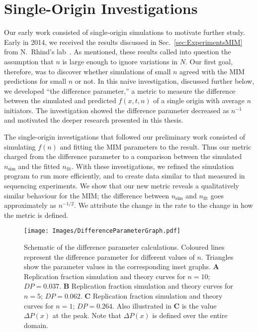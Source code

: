 	\section{Single-Origin Investigations}
	\label{sec:SingleOrigin}
	
	Our early work consisted of single-origin simulations to motivate further study.
	Early in 2014, we received the results discussed in Sec.~\ref{sec:ExperimentsMIM} from N.~Rhind's lab~\cite{Rhind}.
	As mentioned, these results called into question the assumption that $n$ is large enough to ignore variations in $N$.
	Our first goal, therefore, was to discover whether simulations of small $n$ agreed with the MIM predictions for small $n$ or not.
	In this naive investigation, discussed further below, we developed ``the difference parameter,'' a metric to measure the difference between the simulated and predicted $f(x,t,n)$ of a single origin with average $n$ initiators.
	The investigation showed the difference parameter decreased as $n^{-1}$ and motivated the deeper research presented in this thesis.
	
	The single-origin investigations that followed our preliminary work consisted of simulating $f(n)$ and fitting the MIM parameters to the result.
	Thus our metric charged from the difference parameter to a comparison between the simulated $n_\text{sim}$ and the fitted $n_\text{fit}$.
	With these investigations, we refined the simulation program to run more efficiently, and to create data similar to that measured in sequencing experiments.
	We show that our new metric reveals a qualitatively similar behaviour for the MIM; the difference between $n_\text{sim}$ and  $n_\text{fit}$ goes approximately as $n^{-1/2}$.
	We attribute the change in the rate to the change in how the metric is defined.
		
	\begin{figure}[tbh!]
		\begin{center}
			\texttt{[image: Images/DifferenceParameterGraph.pdf]}
		\end{center}
			\caption[Difference Parameter]{\label{fig:DifferenceParameter} Schematic of the difference parameter calculations.
				Coloured lines represent the difference parameter for different values of $n$.
				Triangles show the parameter values in the corresponding inset graphs.
				\textbf{A} Replication fraction simulation and theory curves for $n=10$; $DP=0.037$.
				\textbf{B} Replication fraction simulation and theory curves for $n=5$; $DP = 0.062$.
				\textbf{C} Replication fraction simulation and theory curves for $n=1$; $DP = 0.264$.
				Also illustrated in \textbf{C} is the value $\Delta P(x)$ at the peak.
				Note that $\Delta P(x)$ is defined over the entire domain.
				}
	\end{figure}
	
